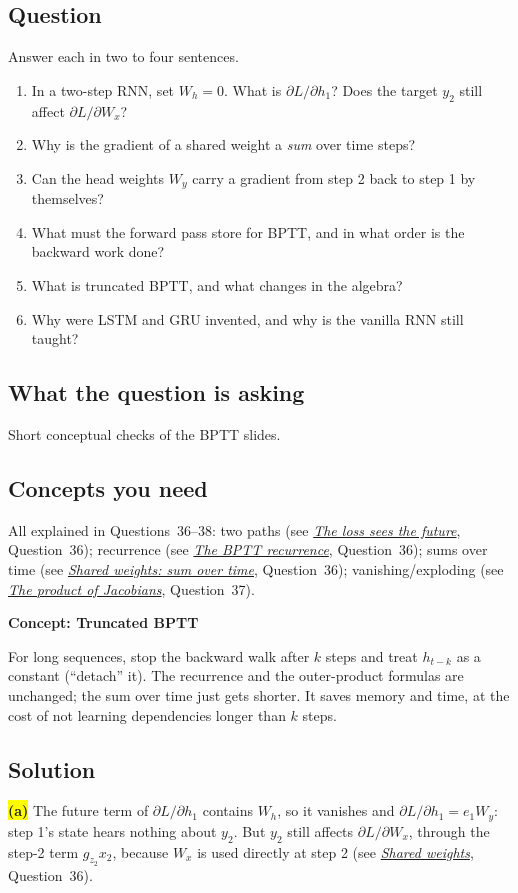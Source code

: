 \documentclass[12pt,a4paper]{article}
\newcommand{\concept}[2]{\par\medskip\phantomsection\label{#1}{\large\bfseries\color{blue!50!black} Concept: #2}\par}
\newcommand{\seeconcept}[3]{(see \hyperref[#1]{\textit{#2}}, Question~#3)}
\newcommand{\hlq}[1]{{\setlength{\fboxsep}{1.5pt}\colorbox{yellow}{#1}}}
\begin{document}
\subsection*{Question}
Answer each in two to four sentences.
\begin{enumerate}[label=(\alph*)]
\item[\hlq{(a)}] In a two-step RNN, set $W_h=0$. What is $\partial L/\partial h_1$? Does the target $y_2$ still affect $\partial L/\partial W_x$?
\item[(b)] Why is the gradient of a shared weight a \emph{sum} over time steps?
\item[\hlq{(c)}] Can the head weights $W_y$ carry a gradient from step 2 back to step 1 by themselves?
\item[\hlq{(d)}] What must the forward pass store for BPTT, and in what order is the backward work done?
\item[\hlq{(e)}] What is truncated BPTT, and what changes in the algebra?
\item[(f)] Why were LSTM and GRU invented, and why is the vanilla RNN still taught?
\end{enumerate}

\subsection*{What the question is asking}
Short conceptual checks of the BPTT slides.

\subsection*{Concepts you need}
All explained in Questions~36--38: two paths \seeconcept{c:bpttpaths}{The loss sees the future}{36}; recurrence \seeconcept{c:bpttrec}{The BPTT recurrence}{36}; sums over time \seeconcept{c:bpttweights}{Shared weights: sum over time}{36}; vanishing/exploding \seeconcept{c:jacprod}{The product of Jacobians}{37}.

\concept{c:truncated}{Truncated BPTT}
For long sequences, stop the backward walk after $k$ steps and treat $h_{t-k}$ as a constant (``detach'' it). The recurrence and the outer-product formulas are unchanged; the sum over time just gets shorter. It saves memory and time, at the cost of not learning dependencies longer than $k$ steps.

\subsection*{Solution}
\hlq{\textbf{(a)}} The future term of $\partial L/\partial h_1$ contains $W_h$, so it vanishes and $\partial L/\partial h_1=e_1W_y$: step 1's state hears nothing about $y_2$. But $y_2$ still affects $\partial L/\partial W_x$, through the step-2 term $g_{z_2}x_2$, because $W_x$ is used directly at step 2 \seeconcept{c:bpttweights}{Shared weights}{36}.
\end{document}
